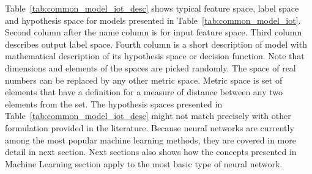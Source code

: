 \documentclass[english, 12pt, a4paper, elec, utf8, online]{aaltothesis}
\begin{document}
Table~\ref{tab:common_model_iot_desc} shows typical feature space, label space and hypothesis space for models presented in Table~\ref{tab:common_model_iot}. Second column after the name column is for input feature space. Third column describes output label space. Fourth column is a short description of model with mathematical description of its hypothesis space or decision function. Note that dimensions and elements of the spaces are picked randomly. The space of real numbers can be replaced by any other metric space. Metric space is set of elements that have a definition for a measure of distance between any two elements from the set. The hypothesis spaces presented in Table~\ref{tab:common_model_iot_desc} might not match precisely with other formulation provided in the literature. Because neural networks are currently among the most popular machine learning methods, they are covered in more detail in next section. Next sections also shows how the concepts presented in Machine Learning section apply to the most basic type of neural network.      
\newpage
\end{document}
